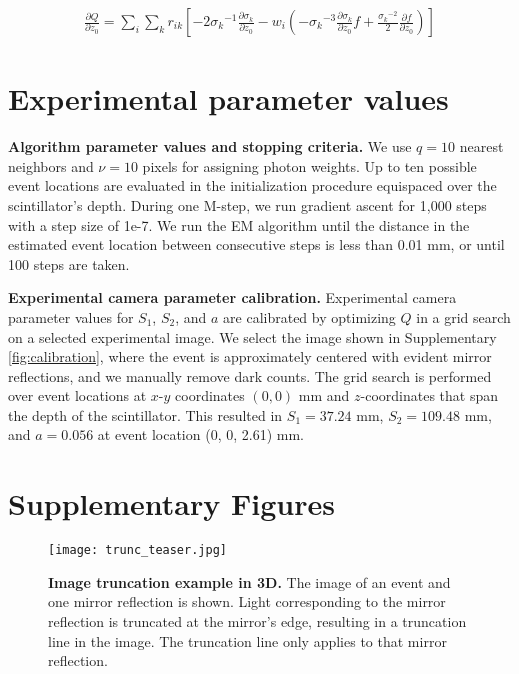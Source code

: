 \documentclass{article}
\begin{document}
\begin{align}
\frac{\partial Q}{\partial z_0} = \sum_i \sum_k r_{ik} \left[ -2{\sigma_k}^{-1}\frac{\partial \sigma_k}{\partial z_0} - w_i\left( -{\sigma_k}^{-3} \frac{\partial \sigma_k}{\partial z_0}f + \frac{{\sigma_k}^{-2}}{2} \frac{\partial f}{\partial z_0}  \right) \right] 
\end{align}


\section{Experimental parameter values} \label{sec:params}

\textbf{Algorithm parameter values and stopping criteria.}
We use $q=10$ nearest neighbors and $\nu=10$ pixels for assigning photon weights.
Up to ten possible event locations are evaluated in the initialization procedure 
equispaced over the scintillator's depth.
During one M-step, we run gradient ascent for 1,000 steps with a step size of 1e-7.
We run the EM algorithm until the distance in the estimated event location between 
consecutive steps is less than 0.01 mm, or until 100 steps are taken.

\noindent
\textbf{Experimental camera parameter calibration.}
Experimental camera parameter values for $S_1$, $S_2$, and $a$ are calibrated by 
optimizing $Q$ in a grid search on a selected experimental image.
We select the image shown in Supplementary \cref*{fig:calibration}, where the 
event is approximately centered with evident mirror reflections, and we manually 
remove dark counts.
The grid search is performed over event locations at $x$-$y$ coordinates 
$(0,0)$ mm and $z$-coordinates that span the depth of the scintillator.
This resulted in $S_1=37.24$ mm, $S_2=109.48$ mm, and $a=0.056$ at event location 
(0, 0, 2.61) mm.


\section{Supplementary Figures}

\begin{figure}
\centering
\texttt{[image: trunc\_teaser.jpg]}
\caption{\textbf{Image truncation example in 3D.}
The image of an event and one mirror reflection is shown. 
Light corresponding to the mirror reflection is truncated at the mirror's edge, 
resulting in a truncation line in the image.
The truncation line only applies to that mirror reflection.}
\label{fig:trunc_teaser}
\end{figure}
\end{document}
